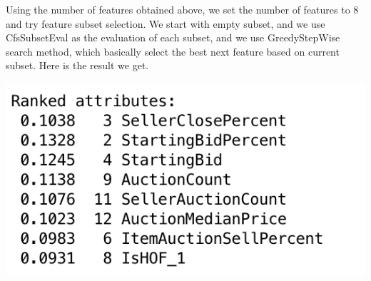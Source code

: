 \documentclass[CEJM,PDF]{cej} %
\begin{document}
Using the number of features obtained above, we set the number of features to 8 and try feature subset selection. We start with empty subset, and we use CfsSubsetEval as the evaluation of each subset, and we use GreedyStepWise search method, which basically select the best next feature based on current subset. Here is the result we get.

{\centering
    \vspace{3 mm}
    \includegraphics[scale=0.6]{weka-FilteredSubsetWithGreedyStepwise.png}
    \par
}
\end{document}

